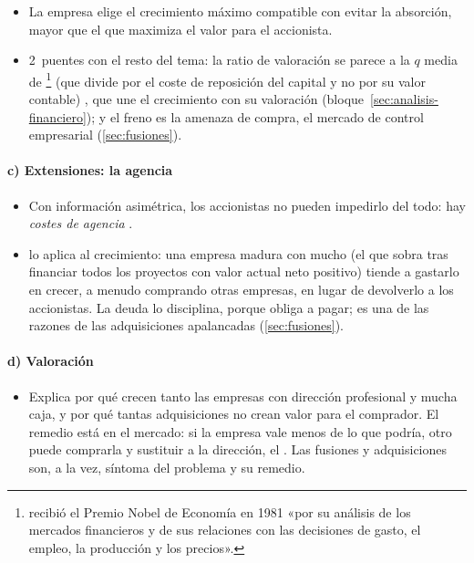 \documentclass[11pt]{article}
\begin{document}
\begin{itemize}
\item La empresa elige el crecimiento máximo compatible con evitar la absorción, mayor que el que maximiza el valor para el accionista.
\item 2~puentes con el resto del tema: la ratio de valoración se parece a la $q$ media de \footnote{ recibió el Premio Nobel de Economía en 1981 «por su análisis de los mercados financieros y de sus relaciones con las decisiones de gasto, el empleo, la producción y los precios»\nocite{Nobel1981Tobin}.} (que divide por el coste de reposición del capital y no por su valor contable) , que une el crecimiento con su valoración (bloque~\ref{sec:analisis-financiero}); y el freno es la amenaza de compra, el mercado de control empresarial (\ref{sec:fusiones}).
\end{itemize}

\paragraph{c) Extensiones: la agencia}

\begin{itemize}
\item Con información asimétrica, los accionistas no pueden impedirlo del todo: hay \emph{costes de agencia}\nocite{JensenMeckling1976Theory} .
\item \textcite{Jensen1986Agency} lo aplica al crecimiento: una empresa madura con mucho  (el que sobra tras financiar todos los proyectos con valor actual neto positivo) tiende a gastarlo en crecer, a menudo comprando otras empresas, en lugar de devolverlo a los accionistas. La deuda lo disciplina, porque obliga a pagar; es una de las razones de las adquisiciones apalancadas (\ref{sec:fusiones}).
\end{itemize}

\paragraph{d) Valoración}

\begin{itemize}
\item Explica por qué crecen tanto las empresas con dirección profesional y mucha caja, y por qué tantas adquisiciones no crean valor para el comprador. El remedio está en el mercado: si la empresa vale menos de lo que podría, otro puede comprarla y sustituir a la dirección, el \nocite{Manne1965Mergers}. Las fusiones y adquisiciones son, a la vez, síntoma del problema y su remedio.
\end{itemize}
\end{document}
